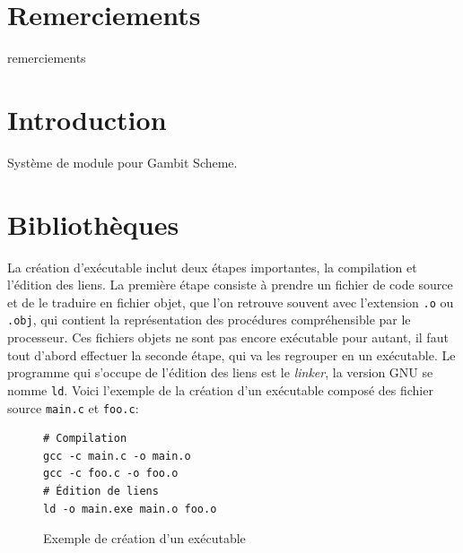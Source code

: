 \documentclass[12pt,initial,twoside,maitrise]{dms}
\numberwithin{equation}{section}
\numberwithin{table}{chapter}
\numberwithin{figure}{chapter}
\begin{document}
\chapter*{Remerciements}

remerciements


\NoChapterPageNumber%


\chapter*{Introduction}

Système de module pour Gambit Scheme.


\chapter[]{Bibliothèques}%
La création d'exécutable inclut deux étapes importantes, la compilation et
l'édition des liens. La première étape consiste à prendre un fichier de code
source et de le traduire en fichier objet, que l'on retrouve souvent avec
l'extension \verb|.o| ou \verb|.obj|, qui contient la représentation des
procédures compréhensible par le processeur. Ces fichiers objets ne sont pas
encore exécutable pour autant, il faut tout d'abord effectuer la seconde étape,
qui va les regrouper en un exécutable. Le programme qui s'occupe de l'édition
des liens est le \textit{linker}, la version GNU se nomme \verb|ld|.  Voici
l'exemple de la création d'un exécutable composé des fichier source
\verb|main.c| et \verb|foo.c|:

\begin{figure}[ht]
    \begin{minipage}[t]{0.5\textwidth}
\begin{verbatim}
# Compilation
gcc -c main.c -o main.o
gcc -c foo.c -o foo.o
# Édition de liens
ld -o main.exe main.o foo.o
\end{verbatim}
    \end{minipage}

    \caption{Exemple de création d'un exécutable}
\end{figure}
\end{document}
